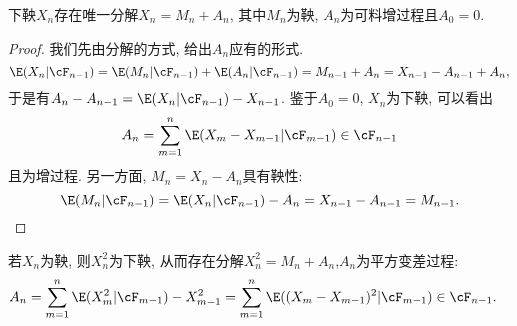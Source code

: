 \documentclass[a4paper, 10pt]{ctexart}
\begin{document}

\begin{theorem}[Doob分解定理]
	下鞅$X_n$存在唯一分解$X_n = M_n + A_n$, 其中$M_n$为鞅, $A_n$为可料增过程且$A_0 = 0$. 
\end{theorem}
\begin{proof}
	我们先由分解的方式, 给出$A_n$应有的形式. 
	\begin{equation*}
		\E(X_n | \cF_{n-1})
		= \E(M_n | \cF_{n-1}) + \E(A_n | \cF_{n-1})
		= M_{n-1} + A_n
		= X_{n-1} - A_{n-1} + A_n, 
	\end{equation*}
	于是有$A_n - A_{n-1} = \E(X_n | \cF_{n-1}) - X_{n-1}$. 
	鉴于$A_0 = 0$, $X_n$为下鞅, 可以看出
	\begin{equation*}
		A_n = \sum_{m = 1}^{n} \E(X_m - X_{m-1} | \cF_{m-1}) \in \cF_{n - 1}
	\end{equation*}
	且为增过程. 
	另一方面, $M_n = X_n - A_n$具有鞅性: 
	\begin{equation*}
		\E(M_n | \cF_{n-1}) 
		= \E(X_n | \cF_{n-1}) - A_n 
		= X_{n-1} - A_{n-1}
		= M_{n-1}. 
	\end{equation*}
\end{proof}

若$X_n$为鞅, 则$X_n^2$为下鞅, 从而存在分解$X_n^2 = M_n + A_n$,$A_n$为平方变差过程: 
\begin{align*}
	A_n 
	&= \sum_{m=1}^n \E(X_m^2 | \cF_{m-1}) - X_{m-1}^2
	= \sum_{m=1}^n \E((X_m - X_{m-1})^2 | \cF_{m-1}) \in \cF_{n-1}. 
\end{align*}
\end{document}
